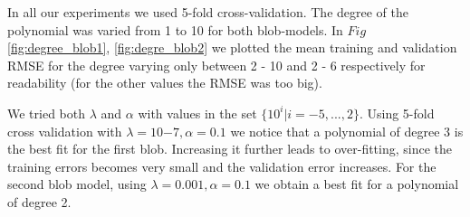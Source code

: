 In all our experiments we used 5-fold cross-validation. The degree of the polynomial was varied from 1 to 10 for both blob-models. In $Fig$ \ref{fig:degree_blob1}, \ref{fig:degre_blob2} we plotted the mean training and validation RMSE for the degree varying only between 2 - 10 and 2 - 6 respectively for readability (for the other values the RMSE was too big). 

We tried both $\lambda$ and $\alpha$ with values in the set $\{10^i | i =-5,...,2\}$.
Using 5-fold cross validation with $\lambda = 10{-7}, \alpha = 0.1$ we
notice that a polynomial of degree 3 is the best fit for the first blob. Increasing it further leads to over-fitting, since the training errors becomes very small and the validation error increases. For the second blob model, using  $\lambda = 0.001, \alpha = 0.1$ we obtain a best fit for a polynomial of degree 2.

